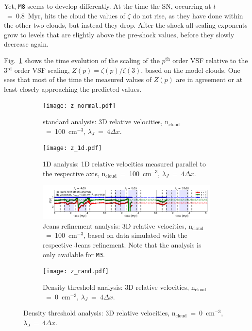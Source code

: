 Yet, \texttt{M8} seems to develop differently.
At the time the SN, occurring at $t$~=~0.8~Myr, hits the cloud the values of $\zeta$ do not rise, as they have done within the other two clouds, but instead they drop. 
After the shock all scaling exponents grow to levels that are slightly above the pre-shock values, before they slowly decrease again.

Fig.~\ref{pic:results:z_all_normal} shows the time evolution of the scaling of the $p^\mathrm{th}$ order VSF relative to the 3$^\mathrm{rd}$ order VSF scaling, $Z(p) = \zeta(p)/\zeta(3)$, based on the model clouds. 
One sees that most of the time the measured values of $Z(p)$ are in agreement or at least closely approaching the predicted values.

\begin{figure}[!htb]
\centering
\begin{subfigure}{\textwidth}
    \texttt{[image: z\_normal.pdf]}
    \caption{standard analysis: 3D relative velocities, n$_\mathrm{cloud}$~=~100~cm$^{-3}$, $\lambda_J$~=~$4\Delta{}x$.}
    \label{pic:results:z_all_normal}
\end{subfigure}

\begin{subfigure}{\textwidth}
    \texttt{[image: z\_1d.pdf]}
    \caption{1D analysis: 1D relative velocities measured parallel to the respective axis, n$_\mathrm{cloud}$~=~100~cm$^{-3}$, $\lambda_J$~=~$4\Delta{}x$.}
    \label{pic:results:z_all_1d}
\end{subfigure}

\begin{subfigure}{\textwidth}
    \includegraphics[width=\textwidth]{z_jeans.pdf}
    \caption{Jeans refinement analysis: 3D relative velocities, n$_\mathrm{cloud}$~=~100~cm$^{-3}$, based on data simulated with the respective Jeans refinement. Note that the analysis is only available for \texttt{M3}.}
    \label{pic:results:z_all_jeans}
\end{subfigure}

\begin{subfigure}{\textwidth}
    \texttt{[image: z\_rand.pdf]}
    \caption{Density threshold analysis: 3D relative velocities, n$_\mathrm{cloud}$~=~0~cm$^{-3}$, $\lambda_J$~=~$4\Delta{}x$.}
    \label{pic:results:z_all_rand}
\end{subfigure}


\end{figure}
